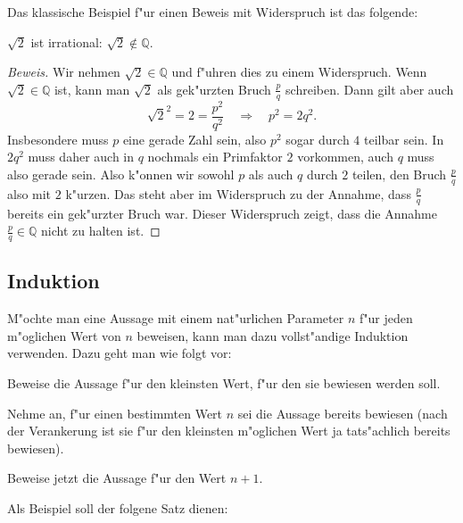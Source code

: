 Das klassische Beispiel f"ur einen Beweis mit Widerspruch ist das 
folgende:
\begin{satz}$\sqrt{2}$ ist irrational: $\sqrt{2}\not\in\mathbb Q$.
\end{satz}
\begin{proof}[Beweis]
Wir nehmen $\sqrt{2}\in\mathbb Q$ und f"uhren dies zu einem
Widerspruch. Wenn $\sqrt{2}\in\mathbb Q$ ist, kann man $\sqrt{2}$
als gek"urzten Bruch $\frac{p}{q}$ schreiben. Dann gilt aber
auch
\[
\sqrt{2}^2=2=\frac{p^2}{q^2}\quad\Rightarrow\quad p^2=2q^2.
\]
Insbesondere muss $p$ eine gerade Zahl sein, also $p^2$ sogar
durch $4$ teilbar sein. In $2q^2$ muss daher auch in $q$ nochmals
ein Primfaktor $2$ vorkommen, auch $q$ muss also gerade sein.
Also k"onnen wir sowohl $p$ als auch $q$ durch $2$ teilen,
den Bruch $\frac{p}q$ also mit $2$ k"urzen.
Das steht aber im Widerspruch zu der Annahme, dass $\frac{p}q$ bereits
ein gek"urzter Bruch war. Dieser Widerspruch zeigt, dass die
Annahme $\frac{p}q\in\mathbb Q$ nicht zu halten ist.
\end{proof}

\subsection{Induktion}
M"ochte man eine Aussage mit einem nat"urlichen Parameter $n$ f"ur jeden
m"oglichen Wert von $n$ beweisen, kann man dazu vollst"andige Induktion
verwenden. Dazu geht man wie folgt vor:
\begin{description}
\item[Verankerung:] Beweise die Aussage f"ur den kleinsten Wert,
f"ur den sie bewiesen werden soll.
\item[Induktionsannahme:] Nehme an, f"ur einen bestimmten Wert
$n$ sei die Aussage bereits bewiesen (nach der Verankerung ist sie 
f"ur den kleinsten m"oglichen Wert ja tats"achlich bereits bewiesen).
\item[Induktionsschritt:] Beweise jetzt die Aussage f"ur den Wert $n+1$.
\end{description}

Als Beispiel soll der folgene Satz dienen:

